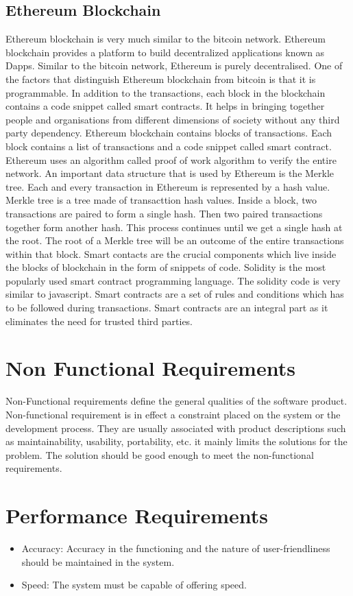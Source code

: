 \subsection{Ethereum Blockchain}
Ethereum blockchain is very much similar to the bitcoin network.
Ethereum blockchain provides a platform to build decentralized applications
known as Dapps. Similar to the bitcoin network, Ethereum is purely
decentralised. One of the factors that distinguish Ethereum blockchain from
bitcoin is that it is programmable. In addition to the transactions, each block in
the blockchain contains a code snippet called smart contracts. It helps in bringing
together people and organisations from different dimensions of society without
any third party dependency. Ethereum blockchain contains blocks of transactions.
Each block contains a list of transactions and a code snippet called smart contract.
Ethereum uses an algorithm called proof of work algorithm to verify the entire
network. An important data structure that is used by Ethereum is the Merkle tree.
Each and every transaction in Ethereum is represented by a hash value. Merkle
tree is a tree made of transacttion hash values. Inside a block, two transactions
are paired to form a single hash. Then two paired transactions together form
another hash. This process continues until we get a single hash at the root. The
root of a Merkle tree will be an outcome of the entire transactions within that
block. Smart contacts are the crucial components which live inside the blocks of
blockchain in the form of snippets of code. Solidity is the most popularly used
smart contract programming language. The solidity code is very similar to
javascript. Smart contracts are a set of rules and conditions which has to be
followed during transactions. Smart contracts are an integral part as it eliminates
the need for trusted third parties.

\section{Non Functional Requirements}
Non-Functional requirements define the general qualities of the software product. Non-functional requirement is in effect a constraint placed on the system or the development process. They are usually associated with product descriptions such as maintainability, usability, portability, etc. it mainly limits the solutions for the problem. The solution should be good enough to meet the non-functional requirements. 
\section{Performance Requirements}
\begin{itemize}
    \item Accuracy: Accuracy in the functioning and the nature of user-friendliness should be maintained in the system. 
    \item Speed: The system must be capable of offering speed. 
\end{itemize}
